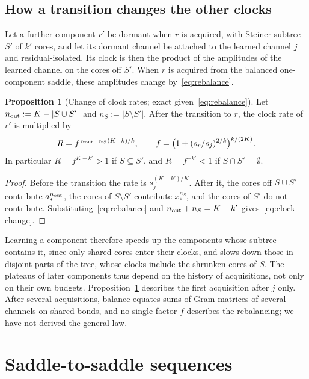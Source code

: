 \documentclass[11pt]{article}
\theoremstyle{definition}
\newtheorem{proposition}[theorem]{Proposition}
\numberwithin{equation}{section}
\begin{document}
\subsection{How a transition changes the other clocks}

Let a further component $r'$ be dormant when $r$ is acquired, with Steiner subtree $S'$ of $k'$ cores, and let its dormant channel be attached to the learned channel $j$ and residual-isolated. Its clock is then the product of the amplitudes of the learned channel on the cores off $S'$. When $r$ is acquired from the balanced one-component saddle, these amplitudes change by~\eqref{eq:rebalance}.

\begin{proposition}[Change of clock rates; exact given~\eqref{eq:rebalance}]\label{prop:clock-change}
Let $n_{\rm out}:=K-|S\cup S'|$ and $n_S:=|S\setminus S'|$. After the transition to $r$, the clock rate of $r'$ is multiplied by
\begin{equation}\label{eq:clock-change}
R=f^{\,n_{\rm out}-n_S(K-k)/k},\qquad f=\big(1+(s_r/s_j)^{2/k}\big)^{k/(2K)}.
\end{equation}
In particular $R=f^{K-k'}>1$ if $S\subseteq S'$, and $R=f^{-k'}<1$ if $S\cap S'=\emptyset$.
\end{proposition}

\begin{proof}
Before the transition the rate is $s_j^{(K-k')/K}$. After it, the cores off $S\cup S'$ contribute $a_*^{n_{\rm out}}$, the cores of $S\setminus S'$ contribute $x_*^{n_S}$, and the cores of $S'$ do not contribute. Substituting~\eqref{eq:rebalance} and $n_{\rm out}+n_S=K-k'$ gives~\eqref{eq:clock-change}.
\end{proof}

Learning a component therefore speeds up the components whose subtree contains it, since only shared cores enter their clocks, and slows down those in disjoint parts of the tree, whose clocks include the shrunken cores of $S$. The plateaus of later components thus depend on the history of acquisitions, not only on their own budgets. Proposition~\ref{prop:clock-change} describes the first acquisition after $j$ only. After several acquisitions, balance equates sums of Gram matrices of several channels on shared bonds, and no single factor $f$ describes the rebalancing; we have not derived the general law.

\section{Saddle-to-saddle sequences}\label{sec:sequences}
\end{document}
